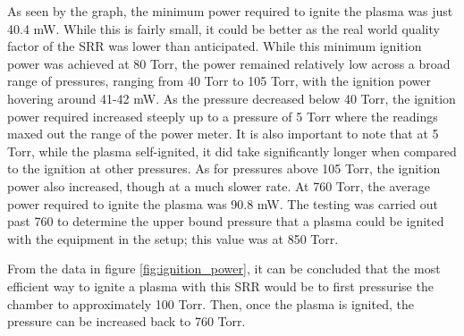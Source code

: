 As seen by the graph, the minimum power required to ignite the plasma was just 40.4 mW. While this is fairly small, it could be better as the real world quality factor of the SRR was lower than anticipated. While this minimum ignition power was achieved at 80 Torr, the power remained relatively low across a broad range of pressures, ranging from 40 Torr to 105 Torr, with the ignition power hovering around 41-42 mW. As the pressure decreased below 40 Torr, the ignition power required increased steeply up to a pressure of 5 Torr where the readings maxed out the range of the power meter. It is also important to note that at 5 Torr, while the plasma self-ignited, it did take significantly longer when compared to the ignition at other pressures. As for pressures above 105 Torr, the ignition power also increased, though at a much slower rate. At 760 Torr, the average power required to ignite the plasma was 90.8 mW. The testing was carried out past 760 to determine the upper bound pressure that a plasma could be ignited with the equipment in the setup; this value was at 850 Torr. 

From the data in figure \ref{fig:ignition_power}, it can be concluded that the most efficient way to ignite a plasma with this SRR would be to first pressurise the chamber to approximately 100 Torr. Then, once the plasma is ignited, the pressure can be increased back to 760 Torr. 





